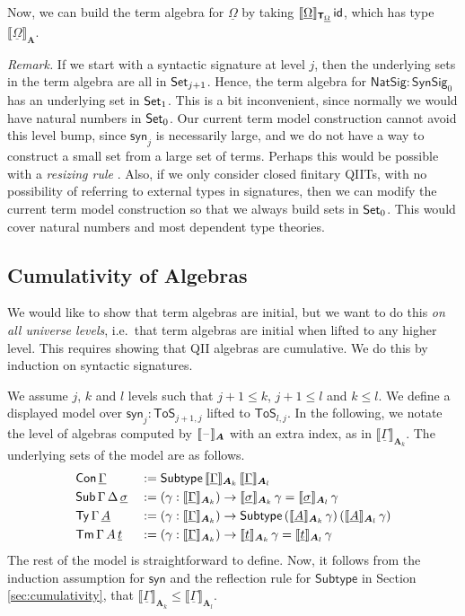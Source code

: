 \documentclass[sigplan,review,anonymous]{acmart}\settopmatter{printfolios=true,printccs=false,printacmref=false}
\newcommand{\ToS}{\mathsf{ToS}}
\newcommand{\Subtype}{\mathsf{Subtype}}
\newcommand{\NatSig}{\mathsf{NatSig}}
\newcommand{\syn}{\mathsf{syn}}
\newcommand{\SynSig}{\mathsf{SynSig}}
\newcommand{\bA}{\boldsymbol{A}}
\newcommand{\bT}{\boldsymbol{\mathsf{T}}}
\newcommand{\ul}[1]{\underline{#1}}
\newcommand{\ulGamma}{\ul{\Gamma}}
\newcommand{\ulOmega}{\ul{\Omega}}
\newcommand{\ulsigma}{\ul{\sigma}}
\newcommand{\ult}{\ul{t}}
\newcommand{\ulA}{\ul{A}}
\newcommand{\llb}{\llbracket}
\newcommand{\rrb}{\rrbracket}
\begin{document}
Now, we can build the term algebra for $\ulOmega$ by taking
$\llb\ulOmega\rrb_{\bT_{\ulOmega}}\,\id$, which has type $\llb\ulOmega\rrb_{\bA}$.

\emph{Remark.} If we start with a syntactic signature at level $j$, then the
underlying sets in the term algebra are all in $\mathsf{Set}_{j+1}$. Hence, the term
algebra for $\NatSig : \SynSig_0$ has an underlying set in $\mathsf{Set}_1$. This is
a bit inconvenient, since normally we would have natural numbers in $\mathsf{Set}_0$. Our
current term model construction cannot avoid this level bump, since $\syn_j$ is
necessarily large, and we do not have a way to construct a small set from
a large set of terms. Perhaps this would be possible with a \emph{resizing rule}
\cite{voevodsky2011resizing}. Also, if we only consider closed finitary QIITs,
with no possibility of referring to external types in signatures, then we can
modify the current term model construction so that we always build sets in
$\mathsf{Set}_0$. This would cover natural numbers and most dependent type theories.

\subsection{Cumulativity of Algebras}

We would like to show that term algebras are initial, but we want to do this
\emph{on all universe levels}, i.e.\ that term algebras are initial when lifted
to any higher level. This requires showing that QII algebras are
cumulative. We do this by induction on syntactic signatures.

\begin{definition} We assume $j$, $k$ and $l$ levels such that $j+1 \leq k$, $j+1 \leq l$ and $k \leq l$. We define a displayed model over $\syn_j : \ToS_{j+1, j}$ lifted to
$\ToS_{l, j}$. In the following, we notate the level of algebras computed by
  $\llb\blank\rrb_{\bA}$ with an extra index, as in
  $\llb\ulGamma\rrb_{\bA_k}$. The underlying sets of the model are as follows.
\begin{alignat*}{3}
  & \Con\,\ulGamma && := \Subtype\,\llb\ulGamma\rrb_{\bA_k}\,\llb\ulGamma\rrb_{\bA_l}\\
  & \Sub\,\Gamma\,\Delta\,\ulsigma && := (\gamma : \llb\ulGamma\rrb_{\bA_k})\ra
  \llb\ulsigma\rrb_{\bA_k}\,\gamma = \llb\ulsigma\rrb_{\bA_l}\,\gamma\\
  & \Ty\,\Gamma\,\ulA &&:= (\gamma : \llb\ulGamma\rrb_{\bA_k})\ra
      \Subtype\,(\llb\ulA\rrb_{\bA_k}\,\gamma)\,(\llb\ulA\rrb_{\bA_l}\,\gamma)\\
  & \Tm\,\Gamma\,A\,\ult &&:= (\gamma : \llb\ulGamma\rrb_{\bA_k})\ra
     \llb\ult\rrb_{\bA_k}\,\gamma = \llb\ult\rrb_{\bA_l}\,\gamma
\end{alignat*}
The rest of the model is straightforward to define. Now, it follows from the
induction assumption for $\syn$ and the reflection rule for $\Subtype$ in
Section \ref{sec:cumulativity}, that $\llb\ulGamma\rrb_{\bA_k} \leq
\llb\ulGamma\rrb_{\bA_l}$.
\end{definition}
\end{document}
